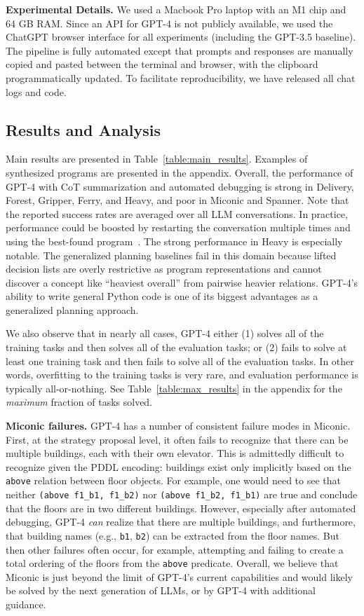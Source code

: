 \documentclass[letterpaper]{article} %
\begin{document}
\textbf{Experimental Details.}
We used a Macbook Pro laptop with an M1 chip and 64 GB RAM.
Since an API for GPT-4 is not publicly available, we used the ChatGPT browser interface for all experiments (including the GPT-3.5 baseline).
The pipeline is fully automated except that prompts and responses are manually copied and pasted between the terminal and browser, with the clipboard programmatically updated.
To facilitate reproducibility, we have released all chat logs and code.


\subsection{Results and Analysis}

Main results are presented in Table~\ref{table:main_results}.
Examples of synthesized programs are presented in the appendix.
Overall, the performance of GPT-4 with CoT summarization and automated debugging is strong in Delivery, Forest, Gripper, Ferry, and Heavy, and poor in Miconic and Spanner.
Note that the reported success rates are averaged over all LLM conversations.
In practice, performance could be boosted by restarting the conversation multiple times and using the best-found program~\cite{chowdhery2022palm}.
The strong performance in Heavy is especially notable.
The generalized planning baselines fail in this domain because lifted decision lists are overly restrictive as program representations and cannot discover a concept like ``heaviest overall'' from pairwise heavier relations.
GPT-4's ability to write general Python code is one of its biggest advantages as a generalized planning approach.

We also observe that in nearly all cases, GPT-4 either (1) solves all of the training tasks and then solves all of the evaluation tasks; or (2) fails to solve at least one training task and then fails to solve all of the evaluation tasks.
In other words, overfitting to the training tasks is very rare, and evaluation performance is typically all-or-nothing.
See Table~\ref{table:max_results} in the appendix for the \emph{maximum} fraction of tasks solved.

\textbf{Miconic failures.}
GPT-4 has a number of consistent failure modes in Miconic.
First, at the strategy proposal level, it often fails to recognize that there can be multiple buildings, each with their own elevator.
This is admittedly difficult to recognize given the PDDL encoding: buildings exist only implicitly based on the \texttt{above} relation between floor objects.
For example, one would need to see that neither \texttt{(above f1\_b1, f1\_b2)} nor \texttt{(above f1\_b2, f1\_b1)} are true and conclude that the floors are in two different buildings.
However, especially after automated debugging, GPT-4 \emph{can} realize that there are multiple buildings, and furthermore, that building names (e.g., \texttt{b1}, \texttt{b2}) can be extracted from the floor names.
But then other failures often occur, for example, attempting and failing to create a total ordering of the floors from the \texttt{above} predicate.
Overall, we believe that Miconic is just beyond the limit of GPT-4's current capabilities and would likely be solved by the next generation of LLMs, or by GPT-4 with additional guidance.
\end{document}
